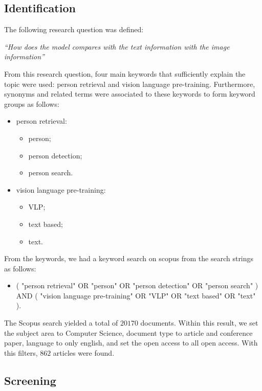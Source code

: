\subsection*{Identification}

The following research question was defined:

\bigskip
\textit{``How does the model compares with the text information with the image information''}
\bigskip



From this research question, four main keywords that sufficiently explain the topic were used: person retrieval and vision language pre-training.
Furthermore, synonyms and related terms were associated to these keywords to form keyword groups as follows:

\begin{itemize}
    \item person retrieval:
    \begin{itemize}
        \item person;
        \item person detection;
        \item person search.
    \end{itemize}
    \item vision language pre-training:
    \begin{itemize}
        \item VLP;
        \item text based;
        \item text.
    \end{itemize}
\end{itemize}


From the keywords, we had a keyword search on scopus from the search strings as follows:

\begin{itemize}
    \item ( "person retrieval" OR "person" OR "person detection" OR "person search" ) AND ( "vision language pre-training" OR "VLP" OR "text based" OR "text" ).
\end{itemize}

The Scopus search yielded a total of $20170$ documents. Within this result, we set the subject area to Computer Science, document type to article and conference paper, language to only english, and set the open access to all open access. With this filters, $862$ articles were found. 

\subsection{Screening}

